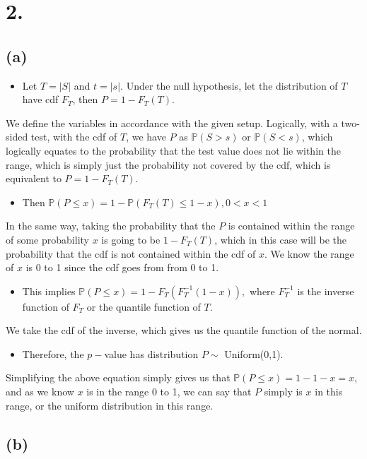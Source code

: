 \documentclass{article}
\begin{document}
\section*{2.}
{\Large 
\subsection*{(a)}

\begin{itemize}
  \item Let $T = |S|$ and $t = |s|$. Under the null hypothesis, let the distribution of $T$ have cdf $F_T$, then $P = 1 - F_T(T).$
\end{itemize}
We define the variables in accordance with the given setup. Logically, with a two-sided test, with the cdf of $T$, we have $P$ as $\mathbb{P}(S > s)$ or $\mathbb{P}(S < s)$, which logically equates to the probability that the test value does not lie within the range, which is simply just the probability not covered by the cdf, which is equivalent to $P = 1 - F_T(T).$
\begin{itemize}
  \item Then $\mathbb{P}(P \leq x) = 1 - \mathbb{P}(F_T(T) \leq 1 - x), 0 < x < 1$
\end{itemize}
In the same way, taking the probability that the $P$ is contained within the range of some probability $x$ is going to be $1 - F_T(T)$, which in this case will be the probability that the cdf is not contained within the cdf of $x$. We know the range of $x$ is 0 to 1 since the cdf goes from from 0 to 1.
\begin{itemize}
  \item This implies $\mathbb{P}(P \leq x) = 1 - F_T(F_T^{-1}(1-x)),$ where $F_T^{-1}$ is the inverse function of $F_T$ or the quantile function of $T$. 
\end{itemize}
We take the cdf of the inverse, which gives us the quantile function of the normal.
\begin{itemize}
  \item Therefore, the $p-$value has distribution $P \sim$ Uniform(0,1).
\end{itemize}
Simplifying the above equation simply gives us that $\mathbb{P}(P \leq x) = 1 - 1 - x = x$, and as we know $x$ is in the range 0 to 1, we can say that $P$ simply is $x$ in this range, or the uniform distribution in this range.

\subsection*{(b)}

}
\end{document}
